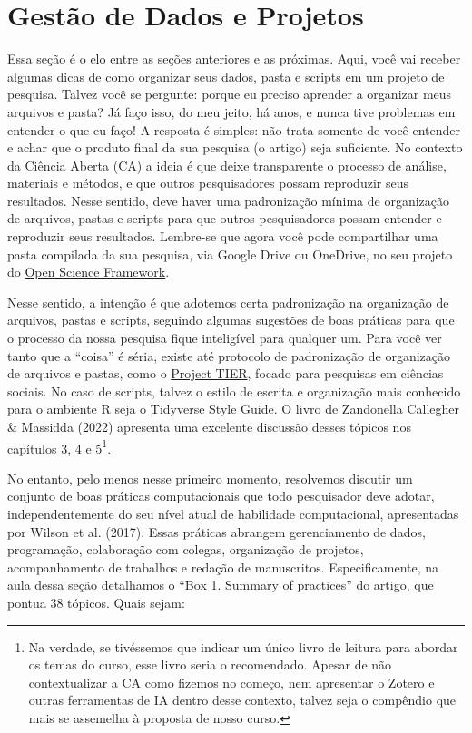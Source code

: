 \documentclass[
  a4paper,
]{article}
\begin{document}

\section{Gestão de Dados e Projetos}\label{sec-project}

Essa seção é o elo entre as seções anteriores e as próximas. Aqui, você
vai receber algumas dicas de como organizar seus dados, pasta e scripts
em um projeto de pesquisa. Talvez você se pergunte: porque eu preciso
aprender a organizar meus arquivos e pasta? Já faço isso, do meu jeito,
há anos, e nunca tive problemas em entender o que eu faço! A resposta é
simples: não trata somente de você entender e achar que o produto final
da sua pesquisa (o artigo) seja suficiente. No contexto da Ciência
Aberta (CA) a ideia é que deixe transparente o processo de análise,
materiais e métodos, e que outros pesquisadores possam reproduzir seus
resultados. Nesse sentido, deve haver uma padronização mínima de
organização de arquivos, pastas e scripts para que outros pesquisadores
possam entender e reproduzir seus resultados. Lembre-se que agora você
pode compartilhar uma pasta compilada da sua pesquisa, via Google Drive
ou OneDrive, no seu projeto do \href{https://osf.io/}{Open Science
Framework}.

Nesse sentido, a intenção é que adotemos certa padronização na
organização de arquivos, pastas e scripts, seguindo algumas sugestões de
boas práticas para que o processo da nossa pesquisa fique inteligível
para qualquer um. Para você ver tanto que a ``coisa'' é séria, existe
até protocolo de padronização de organização de arquivos e pastas, como
o \href{https://www.projecttier.org/}{Project TIER}, focado para
pesquisas em ciências sociais. No caso de scripts, talvez o estilo de
escrita e organização mais conhecido para o ambiente R seja o
\href{https://style.tidyverse.org/}{Tidyverse Style Guide}. O livro de
Zandonella Callegher \& Massidda (2022) apresenta uma excelente
discussão desses tópicos nos capítulos 3, 4 e 5\footnote{Na verdade, se
  tivéssemos que indicar um único livro de leitura para abordar os temas
  do curso, esse livro seria o recomendado. Apesar de não contextualizar
  a CA como fizemos no começo, nem apresentar o Zotero e outras
  ferramentas de IA dentro desse contexto, talvez seja o compêndio que
  mais se assemelha à proposta de nosso curso.}.

No entanto, pelo menos nesse primeiro momento, resolvemos discutir um
conjunto de boas práticas computacionais que todo pesquisador deve
adotar, independentemente do seu nível atual de habilidade
computacional, apresentadas por Wilson et al. (2017). Essas práticas
abrangem gerenciamento de dados, programação, colaboração com colegas,
organização de projetos, acompanhamento de trabalhos e redação de
manuscritos. Especificamente, na aula dessa seção detalhamos o ``Box 1.
Summary of practices'' do artigo, que pontua 38 tópicos. Quais sejam:
\end{document}

